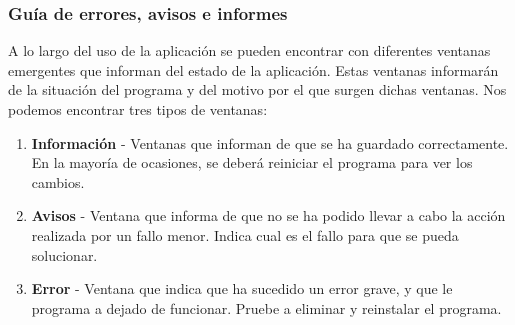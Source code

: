 \subsubsection{Guía de errores, avisos e informes}
A lo largo del uso de la aplicación se pueden encontrar con diferentes ventanas emergentes que informan del estado de la aplicación. Estas ventanas informarán de la situación del programa y del motivo por el que surgen dichas ventanas.
Nos podemos encontrar tres tipos de ventanas:
\begin{enumerate}
\item \textbf{Información} - Ventanas que informan de que se ha guardado correctamente. En la mayoría de ocasiones, se deberá reiniciar el programa para ver los cambios.
\item \textbf{Avisos} - Ventana que informa de que no se ha podido llevar a cabo la acción realizada por un fallo menor. Indica cual es el fallo para que se pueda solucionar.
\item \textbf{Error} - Ventana que indica que ha sucedido un error grave, y que le programa a dejado de funcionar. Pruebe a eliminar y reinstalar el programa.

\end{enumerate}